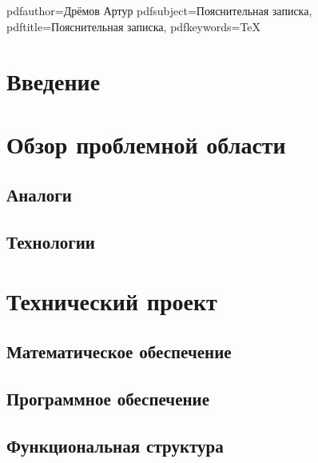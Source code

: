 

\hypersetup
{
  pdfauthor={Дрёмов Артур}
  pdfsubject={Пояснительная записка},
  pdftitle={Пояснительная записка},
  pdfkeywords={TeX}
}




  

  \setcounter{page}{3}
  \tableofcontents
  
  \section*{Введение}

  \section{Обзор проблемной области}

    \subsection{Аналоги}

    \subsection{Технологии}

  \section{Технический проект}

    \subsection{Математическое обеспечение}

    \subsection{Программное обеспечение}

    \subsection{Функциональная структура}

